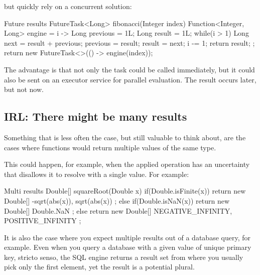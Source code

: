 \documentclass[12pt,a4paper]{report}
\renewcommand{\baselinestretch}{1.5}
\theoremstyle{theorem}
\theoremstyle{definition}
\begin{document}
\renewcommand{\baselinestretch}{1.5} 
\selectfont

but quickly rely on a concurrent solution:

\renewcommand{\baselinestretch}{1} 
\selectfont

\begin{javacode}{Future results}
FutureTask<Long> fibonacci(Integer index)
{
  Function<Integer, Long> engine = i -> {
    Long previous = 1L;
    Long result = 1L;
    while(i > 1) {
      Long next = result + previous;
      previous = result;
      result = next;
      i -= 1;
    }
    return result;
  };
  return new FutureTask<>(() -> engine(index));
}
\end{javacode}

\renewcommand{\baselinestretch}{1.5} 
\selectfont

The advantage is that not only the task could be called
immediately, but it could also be sent on an executor service
for parallel evaluation. The result occurs later, but not now.

\subsection{IRL: There might be many results}

Something that is less often the case, but still
valuable to think about, are the cases where functions would return
multiple values of the same type.

This could happen, for example, when the applied operation has
an uncertainty that disallows it to resolve with a single value.
For example:

\renewcommand{\baselinestretch}{1} 
\selectfont

\begin{javacode}{Multi results}
Double[] squareRoot(Double x)
{
  if(Double.isFinite(x))
    return new Double[]{
      -sqrt(abs(x)),
      sqrt(abs(x))
    };
  else if(Double.isNaN(x))
    return new Double[]{ Double.NaN };
  else
    return new Double[] {
      NEGATIVE_INFINITY,
      POSITIVE_INFINITY
    };
}
\end{javacode}

\renewcommand{\baselinestretch}{1.5} 
\selectfont

It is also the case where you expect multiple results out of a
database query, for example. Even when you query a database with
a given value of unique primary key, stricto senso, the SQL engine
returns a result set from where you usually pick only the first element,
yet the result is a potential plural.
\end{document}
